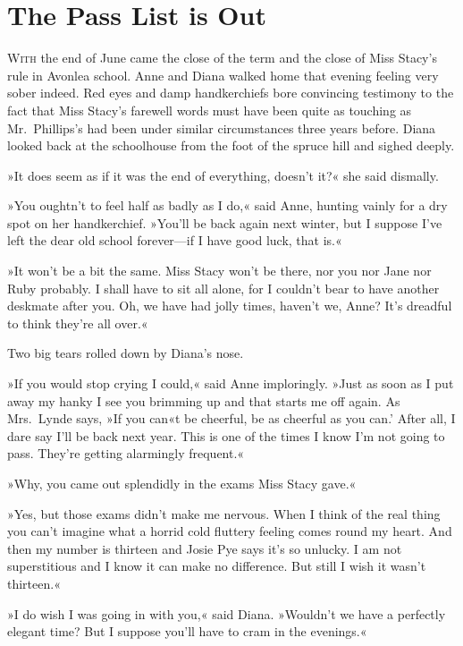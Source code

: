 \chapter{The Pass List is Out}

\lettrine[lines=4]{W}{ith} the end of June came the close of the term and the close of Miss Stacy's rule in Avonlea school. Anne and Diana walked home that evening feeling very sober indeed. Red eyes and damp handkerchiefs bore convincing testimony to the fact that Miss Stacy's farewell words must have been quite as touching as Mr.~Phillips's had been under similar circumstances three years before. Diana looked back at the schoolhouse from the foot of the spruce hill and sighed deeply.

»It does seem as if it was the end of everything, doesn't it?« she said dismally.

»You oughtn't to feel half as badly as I do,« said Anne, hunting vainly for a dry spot on her handkerchief. »You'll be back again next winter, but I suppose I've left the dear old school forever—if I have good luck, that is.«

»It won't be a bit the same. Miss Stacy won't be there, nor you nor Jane nor Ruby probably. I shall have to sit all alone, for I couldn't bear to have another deskmate after you. Oh, we have had jolly times, haven't we, Anne? It's dreadful to think they're all over.«

Two big tears rolled down by Diana's nose.

»If you would stop crying I could,« said Anne imploringly. »Just as soon as I put away my hanky I see you brimming up and that starts me off again. As Mrs.~Lynde says, »If you can«t be cheerful, be as cheerful as you can.' After all, I dare say I'll be back next year. This is one of the times I know I'm not going to pass. They're getting alarmingly frequent.«

»Why, you came out splendidly in the exams Miss Stacy gave.«

»Yes, but those exams didn't make me nervous. When I think of the real thing you can't imagine what a horrid cold fluttery feeling comes round my heart. And then my number is thirteen and Josie Pye says it's so unlucky. I am not superstitious and I know it can make no difference. But still I wish it wasn't thirteen.«

»I do wish I was going in with you,« said Diana. »Wouldn't we have a perfectly elegant time? But I suppose you'll have to cram in the evenings.«

